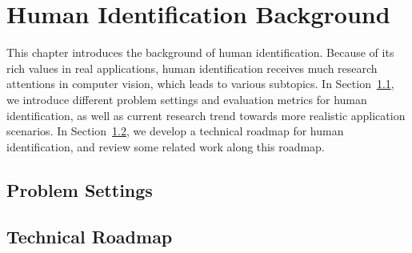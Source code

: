 \chapter{Human Identification Background}
\label{ch:human-identification-background}



This chapter introduces the background of human identification. Because of its rich values in real applications, human identification receives much research attentions in computer vision, which leads to various subtopics. In Section~\ref{sec:human-id-prob-settings}, we introduce different problem settings and evaluation metrics for human identification, as well as current research trend towards more realistic application scenarios. In Section~\ref{sec:human-id-tech-roadmap}, we develop a technical roadmap for human identification, and review some related work along this roadmap.

\section{Problem Settings} %
\label{sec:human-id-prob-settings}


\section{Technical Roadmap} %
\label{sec:human-id-tech-roadmap}

